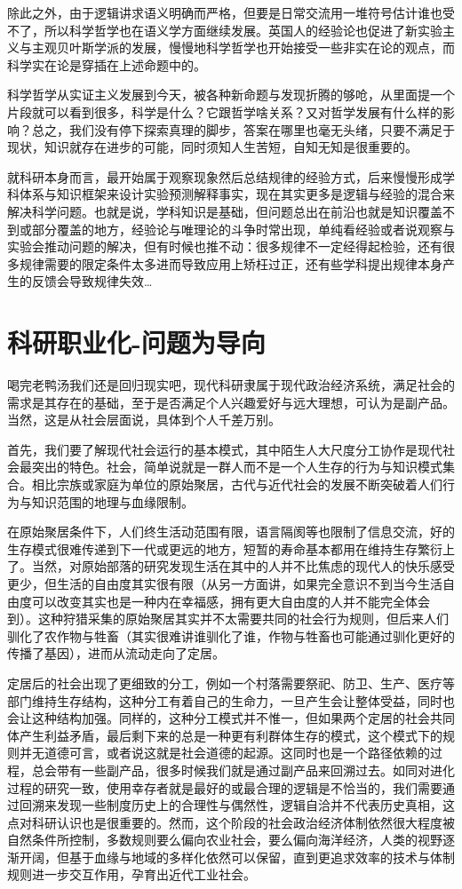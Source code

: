 \documentclass[]{book}
\begin{document}
除此之外，由于逻辑讲求语义明确而严格，但要是日常交流用一堆符号估计谁也受不了，所以科学哲学也在语义学方面继续发展。英国人的经验论也促进了新实验主义与主观贝叶斯学派的发展，慢慢地科学哲学也开始接受一些非实在论的观点，而科学实在论是穿插在上述命题中的。

科学哲学从实证主义发展到今天，被各种新命题与发现折腾的够呛，从里面提一个片段就可以看到很多，科学是什么？它跟哲学啥关系？又对哲学发展有什么样的影响？总之，我们没有停下探索真理的脚步，答案在哪里也毫无头绪，只要不满足于现状，知识就存在进步的可能，同时须知人生苦短，自知无知是很重要的。

就科研本身而言，最开始属于观察现象然后总结规律的经验方式，后来慢慢形成学科体系与知识框架来设计实验预测解释事实，现在其实更多是逻辑与经验的混合来解决科学问题。也就是说，学科知识是基础，但问题总出在前沿也就是知识覆盖不到或部分覆盖的地方，经验论与唯理论的斗争时常出现，单纯看经验或者说观察与实验会推动问题的解决，但有时候也推不动：很多规律不一定经得起检验，还有很多规律需要的限定条件太多进而导致应用上矫枉过正，还有些学科提出规律本身产生的反馈会导致规律失效\ldots{}

\section{科研职业化-问题为导向}\label{-}

喝完老鸭汤我们还是回归现实吧，现代科研隶属于现代政治经济系统，满足社会的需求是其存在的基础，至于是否满足个人兴趣爱好与远大理想，可认为是副产品。当然，这是从社会层面说，具体到个人千差万别。

首先，我们要了解现代社会运行的基本模式，其中陌生人大尺度分工协作是现代社会最突出的特色。社会，简单说就是一群人而不是一个人生存的行为与知识模式集合。相比宗族或家庭为单位的原始聚居，古代与近代社会的发展不断突破着人们行为与知识范围的地理与血缘限制。

在原始聚居条件下，人们终生活动范围有限，语言隔阂等也限制了信息交流，好的生存模式很难传递到下一代或更远的地方，短暂的寿命基本都用在维持生存繁衍上了。当然，对原始部落的研究发现生活在其中的人并不比焦虑的现代人的快乐感受更少，但生活的自由度其实很有限（从另一方面讲，如果完全意识不到当今生活自由度可以改变其实也是一种内在幸福感，拥有更大自由度的人并不能完全体会到）。这种狩猎采集的原始聚居其实并不太需要共同的社会行为规则，但后来人们驯化了农作物与牲畜（其实很难讲谁驯化了谁，作物与牲畜也可能通过驯化更好的传播了基因），进而从流动走向了定居。

定居后的社会出现了更细致的分工，例如一个村落需要祭祀、防卫、生产、医疗等部门维持生存结构，这种分工有着自己的生命力，一旦产生会让整体受益，同时也会让这种结构加强。同样的，这种分工模式并不惟一，但如果两个定居的社会共同体产生利益矛盾，最后剩下来的总是一种更有利群体生存的模式，这个模式下的规则并无道德可言，或者说这就是社会道德的起源。这同时也是一个路径依赖的过程，总会带有一些副产品，很多时候我们就是通过副产品来回溯过去。如同对进化过程的研究一致，使用幸存者就是最好的或最合理的逻辑是不恰当的，我们需要通过回溯来发现一些制度历史上的合理性与偶然性，逻辑自洽并不代表历史真相，这点对科研认识也是很重要的。然而，这个阶段的社会政治经济体制依然很大程度被自然条件所控制，多数规则要么偏向农业社会，要么偏向海洋经济，人类的视野逐渐开阔，但基于血缘与地域的多样化依然可以保留，直到更追求效率的技术与体制规则进一步交互作用，孕育出近代工业社会。
\end{document}

